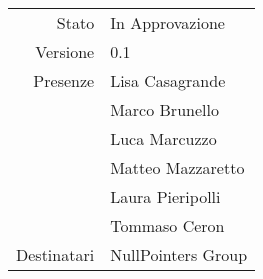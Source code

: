 \begin{center}
\begin{tabular}{r|l}
	Stato & In Approvazione \\
	Versione & 0.1 \\
	Presenze & Lisa Casagrande \\
	         & Marco Brunello \\
             & Luca Marcuzzo \\
	         & Matteo Mazzaretto \\
	         & Laura Pieripolli \\
	         & Tommaso Ceron \\
	Destinatari & NullPointers Group
\end{tabular}
\end{center}